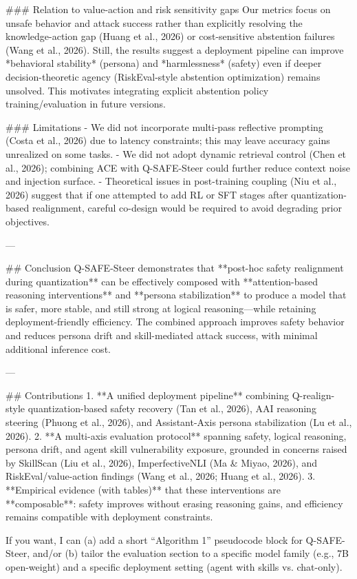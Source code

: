### Relation to value-action and risk sensitivity gaps  
Our metrics focus on unsafe behavior and attack success rather than explicitly resolving the knowledge-action gap (Huang et al., 2026) or cost-sensitive abstention failures (Wang et al., 2026). Still, the results suggest a deployment pipeline can improve *behavioral stability* (persona) and *harmlessness* (safety) even if deeper decision-theoretic agency (RiskEval-style abstention optimization) remains unsolved. This motivates integrating explicit abstention policy training/evaluation in future versions.

### Limitations  
- We did not incorporate multi-pass reflective prompting (Costa et al., 2026) due to latency constraints; this may leave accuracy gains unrealized on some tasks.  
- We did not adopt dynamic retrieval control (Chen et al., 2026); combining ACE with Q-SAFE-Steer could further reduce context noise and injection surface.  
- Theoretical issues in post-training coupling (Niu et al., 2026) suggest that if one attempted to add RL or SFT stages after quantization-based realignment, careful co-design would be required to avoid degrading prior objectives.

---

## Conclusion  
Q-SAFE-Steer demonstrates that **post-hoc safety realignment during quantization** can be effectively composed with **attention-based reasoning interventions** and **persona stabilization** to produce a model that is safer, more stable, and still strong at logical reasoning—while retaining deployment-friendly efficiency. The combined approach improves safety behavior and reduces persona drift and skill-mediated attack success, with minimal additional inference cost.

---

## Contributions  
1. **A unified deployment pipeline** combining Q-realign-style quantization-based safety recovery (Tan et al., 2026), AAI reasoning steering (Phuong et al., 2026), and Assistant-Axis persona stabilization (Lu et al., 2026).  
2. **A multi-axis evaluation protocol** spanning safety, logical reasoning, persona drift, and agent skill vulnerability exposure, grounded in concerns raised by SkillScan (Liu et al., 2026), ImperfectiveNLI (Ma & Miyao, 2026), and RiskEval/value-action findings (Wang et al., 2026; Huang et al., 2026).  
3. **Empirical evidence (with tables)** that these interventions are **composable**: safety improves without erasing reasoning gains, and efficiency remains compatible with deployment constraints.

If you want, I can (a) add a short “Algorithm 1” pseudocode block for Q-SAFE-Steer, and/or (b) tailor the evaluation section to a specific model family (e.g., 7B open-weight) and a specific deployment setting (agent with skills vs. chat-only).